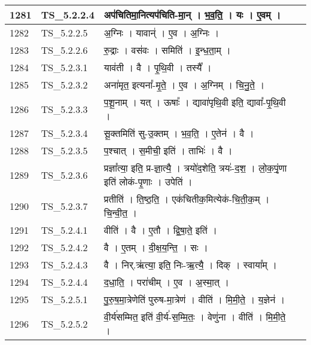 \documentclass[17pt]{extarticle}
\begin{document}
\begin{longtable}{||p{0.4in}||p{0.9in}||p{4.0in}||p{0.9in}||}
            1281 & TS\_5.2.2.4 & अप॑चितिमा॒नित्यप॑चिति{-}मा॒न्   ।   भ॒व॒ति॒   ।   यः   ।   ए॒वम्   ।    &      \\
        \hline
            1282 & TS\_5.2.2.5 & अ॒ग्निः   ।   यावान्॑   ।   ए॒व   ।   अ॒ग्निः   ।    &      \\
        \hline
            1283 & TS\_5.2.2.6 & रु॒द्राः   ।   वस॑वः   ।   समिति॑   ।   इ॒न्ध॒ता॒म्   ।    &      \\
        \hline
            1284 & TS\_5.2.3.1 & याव॑ती   ।   वै   ।   पृ॒थि॒वी   ।   तस्यै᳚   ।    &      \\
        \hline
            1285 & TS\_5.2.3.2 & अना॑मृत॒ इत्यना᳚{-}मृ॒ते॒   ।   ए॒व   ।   अ॒ग्निम्   ।   चि॒नु॒ते॒   ।    &      \\
        \hline
            1286 & TS\_5.2.3.3 & प॒शू॒नाम्   ।   यत्   ।   ऊषाः᳚   ।   द्यावा॑पृथि॒वी इति॒ द्यावा᳚{-}पृ॒थि॒वी   ।    &      \\
        \hline
            1287 & TS\_5.2.3.4 & सू॒क्तमिति॑ सु{-}उ॒क्तम्   ।   भ॒व॒ति॒   ।   ए॒तेन॑   ।   वै   ।    &      \\
        \hline
            1288 & TS\_5.2.3.5 & प॒श्चात्   ।   स॒मीची॒ इति॑   ।   ताभिः॑   ।   वै   ।    &      \\
        \hline
            1289 & TS\_5.2.3.6 & प्रज्ञा᳚त्या॒ इति॒ प्र{-}ज्ञा॒त्यै॒   ।   त्रयो॑द॒शेति॒ त्रयः॑{-}द॒श॒   ।   लो॒क॒पृं॒णा इति॑ लोकं{-}पृ॒णाः   ।   उपेति॑   ।    &      \\
        \hline
            1290 & TS\_5.2.3.7 & प्रतीति॑   ।   ति॒ष्ठ॒ति॒   ।   एक॑चितीक॒मित्येक॑{-}चि॒ती॒क॒म्   ।   चि॒न्वी॒त॒   ।    &      \\
        \hline
            1291 & TS\_5.2.4.1 & वीति॑   ।   वै   ।   ए॒तौ   ।   द्वि॒षा॒ते॒ इति॑   ।    &      \\
        \hline
            1292 & TS\_5.2.4.2 & वै   ।   ए॒तम्   ।   दी॒क्ष॒य॒न्ति॒   ।   सः   ।    &      \\
        \hline
            1293 & TS\_5.2.4.3 & वै   ।   निर्.ऋ॑त्या॒ इति॒ निः{-}ऋ॒त्यै॒   ।   दिक्   ।   स्वाया᳚म्   ।    &      \\
        \hline
            1294 & TS\_5.2.4.4 & द॒धा॒ति॒   ।   परा॑चीम्   ।   ए॒व   ।   अ॒स्मा॒त्   ।    &      \\
        \hline
            1295 & TS\_5.2.5.1 & पु॒रु॒ष॒मा॒त्रेणेति॑ पुरुष{-}मा॒त्रेण॑   ।   वीति॑   ।   मि॒मी॒ते॒   ।   य॒ज्ञेन॑   ।    &      \\
        \hline
            1296 & TS\_5.2.5.2 & वी॒र्य॑सम्मित॒ इति॑ वी॒र्य॑{-}स॒म्मि॒तः॒   ।   वेणु॑ना   ।   वीति॑   ।   मि॒मी॒ते॒   ।    &      \\

\end{longtable}
\end{document}
